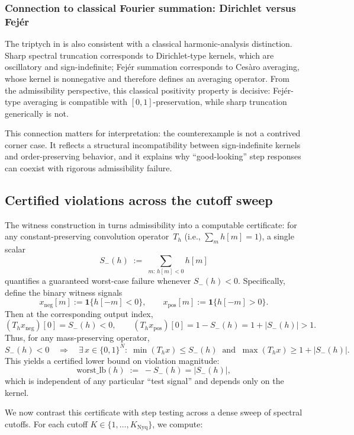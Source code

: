 \documentclass[11pt,a4paper]{article}
\theoremstyle{plain}
\theoremstyle{definition}
\theoremstyle{plain}
\newcommand{\xneg}{x_{\mathrm{neg}}}
\newcommand{\xpos}{x_{\mathrm{pos}}}
\newcommand{\Sminus}{S_{-}}
\newcommand{\worstlb}{\mathrm{worst\_lb}}
\begin{document}
\subsubsection{Connection to classical Fourier summation: Dirichlet versus
  Fej\'er}

The triptych in  is also consistent with a classical
harmonic-analysis distinction.  Sharp spectral truncation corresponds to
Dirichlet-type kernels, which are oscillatory and sign-indefinite; Fej\'er
summation corresponds to Ces\`aro averaging, whose kernel is nonnegative and
therefore defines an averaging operator.  From the admissibility perspective,
this classical positivity property is decisive: Fej\'er-type averaging is
compatible with $[0,1]$-preservation, while sharp truncation generically is not.

This connection matters for interpretation: the counterexample is not a contrived
corner case.  It reflects a structural incompatibility between sign-indefinite
kernels and order-preserving behavior, and it explains why ``good-looking'' step
responses can coexist with rigorous admissibility failure.


\subsection{Certified violations across the cutoff sweep}
\label{sec:certified-sweep}

The witness construction in  turns admissibility into
a computable certificate: for any constant-preserving convolution operator~$T_h$
(i.e., $\sum_m h[m] = 1$), a single scalar
\[
  \Sminus(h)
  \;:=\;
  \sum_{m:\,h[m]<0} h[m]
\]
quantifies a guaranteed worst-case failure whenever $\Sminus(h) < 0$.
Specifically, define the binary witness signals
\[
  \xneg[m] := \mathbf{1}\{h[-m]<0\},
  \qquad
  \xpos[m] := \mathbf{1}\{h[-m]>0\}.
\]
Then at the corresponding output index,
\[
  (T_h \xneg)[0] = \Sminus(h) < 0,
  \qquad
  (T_h \xpos)[0] = 1 - \Sminus(h) = 1 + |\Sminus(h)| > 1.
\]
Thus, for any mass-preserving operator,
\[
  \Sminus(h) < 0
  \quad\Longrightarrow\quad
  \exists\,x \in \{0,1\}^N:\;
  \min(T_h x) \le \Sminus(h)
  \;\;\text{and}\;\;
  \max(T_h x) \ge 1 + |\Sminus(h)|.
\]
This yields a certified lower bound on violation magnitude:
\[
  \worstlb(h) \;:=\; -\Sminus(h) = |\Sminus(h)|,
\]
which is independent of any particular ``test signal'' and depends only on the
kernel.

We now contrast this certificate with step testing across a dense sweep of
spectral cutoffs.  For each cutoff $K \in \{1,\dots,K_{\mathrm{Nyq}}\}$, we
compute:
\end{document}

